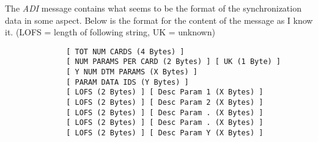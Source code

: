             The \emph{ADI} message contains what seems to be the format of the
            synchronization data in some aspect. Below is the format for the
            content of the message as I know it. (LOFS = length of following
            string, UK = unknown)

            \begin{verbatim}
              [ TOT NUM CARDS (4 Bytes) ]
              [ NUM PARAMS PER CARD (2 Bytes) ] [ UK (1 Byte) ]
              [ Y NUM DTM PARAMS (X Bytes) ]
              [ PARAM DATA IDS (Y Bytes) ]
              [ LOFS (2 Bytes) ] [ Desc Param 1 (X Bytes) ]
              [ LOFS (2 Bytes) ] [ Desc Param 2 (X Bytes) ]
              [ LOFS (2 Bytes) ] [ Desc Param . (X Bytes) ]
              [ LOFS (2 Bytes) ] [ Desc Param . (X Bytes) ]
              [ LOFS (2 Bytes) ] [ Desc Param Y (X Bytes) ]
            \end{verbatim}

